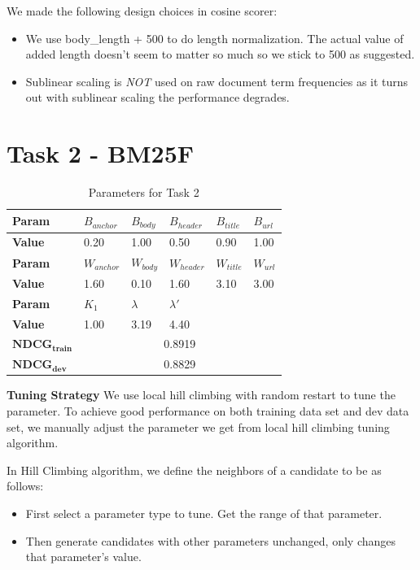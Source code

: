 \documentclass{article}
\begin{document}
We made the following design choices in cosine scorer:

\begin{itemize}
    \item We use body\_length + 500 to do length normalization. The actual value of added length doesn't seem to matter so much so we stick to 500 as suggested.
    \item Sublinear scaling is \emph{NOT} used on raw document term frequencies as it turns out with sublinear scaling the performance degrades.
\end{itemize}

\section{Task 2 - BM25F}

\begin{table}[!htb]
  \centering
  \begin{tabular}{ | l | l | l | l | l | l |}
    \hline
    \textbf{Param} & $B_{anchor}$ & $B_{body}$ & $B_{header}$ & $B_{title}$ & $B_{url}$ \\
    \hline
    \textbf{Value} & 0.20 & 1.00 & 0.50 & 0.90 & 1.00 \\
    \hline
    \textbf{Param} & $W_{anchor}$ & $W_{body}$ & $W_{header}$ & $W_{title}$ & $W_{url}$ \\
    \hline
    \textbf{Value} & 1.60 & 0.10 & 1.60 & 3.10 & 3.00 \\
    \hline
    \textbf{Param} & $K_1$ & $\lambda$ & $\lambda'$ & \multicolumn{2}{c|}{} \\
    \hline
    \textbf{Value} & 1.00 & 3.19 & 4.40 & \multicolumn{2}{c|}{}\\
    \hline
    $\mathbf{NDCG_{train}}$ & \multicolumn{5}{c|}{0.8919} \\
    \hline
    $\mathbf{NDCG_{dev}}$ & \multicolumn{5}{c|}{0.8829} \\
    \hline
  \end{tabular}
  \caption{Parameters for Task 2}
\end{table}

\textbf{Tuning Strategy} We use local hill climbing with random restart to tune the parameter. To achieve good performance on both training data set and dev data set, we manually adjust the parameter we get from local hill climbing tuning algorithm.

In Hill Climbing algorithm, we define the neighbors of a candidate to be as follows:
\begin{itemize}
  \item First select a parameter type to tune. Get the range of that parameter.
  \item Then generate candidates with other parameters unchanged, only changes that parameter's value.
\end{itemize}
\end{document}
